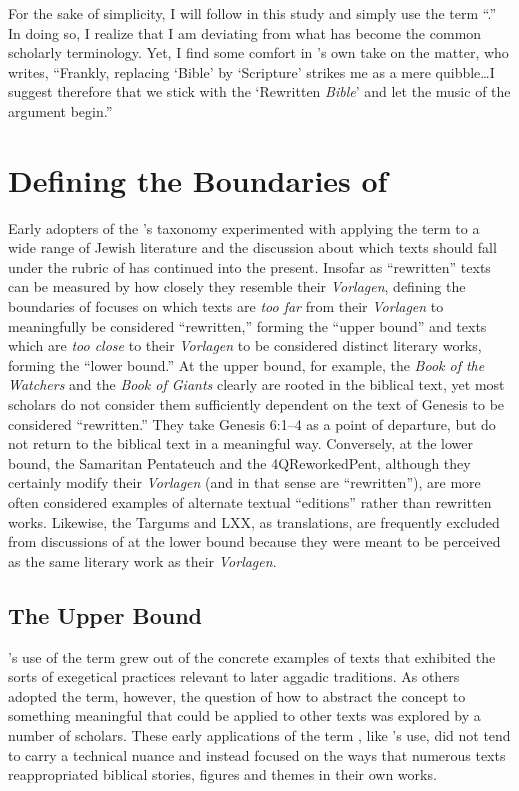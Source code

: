 For the sake of simplicity, I will follow \vermes in this study and simply use the term ``\RwB.'' In doing so, I realize that I am deviating from what has become the common scholarly terminology. Yet, I find some comfort in \vermes's own take on the matter, who writes, ``Frankly, replacing `Bible' by `Scripture' strikes me as a mere quibble\ldots{}I suggest therefore that we stick with the `Rewritten \emph{Bible}' and let the music of the argument begin.''\autocite[original emphasis]{vermes_zsengeller2014} 

\section{Defining the Boundaries of \RWB}

Early adopters of the \vermes's taxonomy experimented with applying the term \rwb to a wide range of \secondtemple Jewish literature and the discussion about which texts should fall under the rubric of \rwb has continued into the present. Insofar as ``rewritten'' texts can be measured by how closely they resemble their \emph{Vorlagen}, defining the boundaries of \rwb focuses on which texts are \emph{too far} from their \emph{Vorlagen} to meaningfully be considered ``rewritten,'' forming the ``upper bound'' and texts which are \emph{too close} to their \emph{Vorlagen} to be considered distinct literary works, forming the ``lower bound.'' At the upper bound, for example, the \emph{Book of the Watchers} and the \emph{Book of Giants} clearly are rooted in the biblical text, yet most scholars do not consider them sufficiently dependent on the text of Genesis to be considered ``rewritten.'' They take Genesis 6:1--4 as a point of departure, but do not return to the biblical text in a meaningful way. Conversely, at the lower bound, the Samaritan Pentateuch and the 4QReworkedPent, although they certainly modify their \emph{Vorlagen} (and in that sense are ``rewritten''), are more often considered examples of alternate textual ``editions'' rather than rewritten works. Likewise, the Targums and LXX, as translations, are frequently excluded from discussions of \rwb at the lower bound because they were meant to be perceived as the same literary work as their \emph{Vorlagen}. 

\subsection{The Upper Bound}

\vermes's use of the term \rwb grew out of the concrete examples of texts that exhibited the sorts of exegetical practices relevant to later aggadic traditions. As others adopted the term, however, the question of how to abstract the concept to something meaningful that could be applied to other texts was explored by a number of scholars. These early applications of the term \rwb, like \vermes's use, did not tend to carry a technical nuance and instead focused on the ways that numerous texts reappropriated biblical stories, figures and themes in their own works. 

